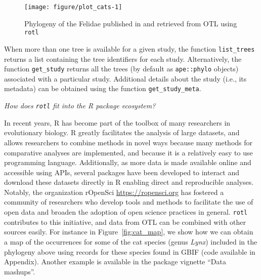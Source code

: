 \documentclass[12pt,letterpaper]{article}\usepackage[]{graphicx}\usepackage[]{color}
\makeatletter
\def\maxwidth{ %
  \ifdim\Gin@nat@width>\linewidth
    \linewidth
  \else
    \Gin@nat@width
  \fi
}
\newenvironment{knitrout}{}{} %
\renewcommand{\subsection}[1]{%
\bigskip
\begin{center}
\begin{large}
\normalfont\itshape #1
\end{large}
\end{center}}
\makeatother
\begin{document}
\begin{knitrout}
\color{fgcolor}\begin{figure}
\texttt{[image: figure/plot\_cats-1]} \caption[Phylogeny of the Felidae published in \citealt{Johnson2006} and retrieved from OTL using \texttt{rotl}]{Phylogeny of the Felidae published in \citealt{Johnson2006} and retrieved from OTL using \texttt{rotl}}\label{fig:plot_cats}
\end{figure}


\end{knitrout}

When more than one tree is available for a given study, the function
\texttt{list\_trees} returns a list containing the tree identifiers for each
study. Alternatively, the function \texttt{get\_study} returns all the trees (by
default as \texttt{ape::phylo} objects) associated with a particular
study. Additional details about the study (i.e., its metadata) can be obtained
using the function \texttt{get\_study\_meta}.


\subsection{How does \texttt{rotl} fit into the R package ecosystem?}
\label{sec:how-does-rotl-fit}

In recent years, R has become part of the toolbox of many researchers in
evolutionary biology. R greatly facilitates the analysis of large datasets, and
allows researchers to combine methods in novel ways because many methods for
comparative analyses are implemented, and because it is a relatively easy to use
programming language. Additionally, as more data is made available online and
accessible using APIs, several packages have been developed to interact and
download these datasets directly in R enabling direct and reproducible analyses.
Notably, the organization rOpenSci \url{https://ropensci.org} has fostered a
community of researchers who develop tools and methods to facilitate the use of
open data and broaden the adoption of open science practices in
general. \texttt{rotl} contributes to this initiative, and data from OTL can be
combined with other sources easily. For instance in Figure~\ref{fig:cat_map}, we
show how we can obtain a map of the occurrences for some of the cat species
(genus \textit{Lynx}) included in the phylogeny above using records for these
species found in GBIF (code available in Appendix). Another example is available
in the package vignette ``Data mashups''.
\end{document}

